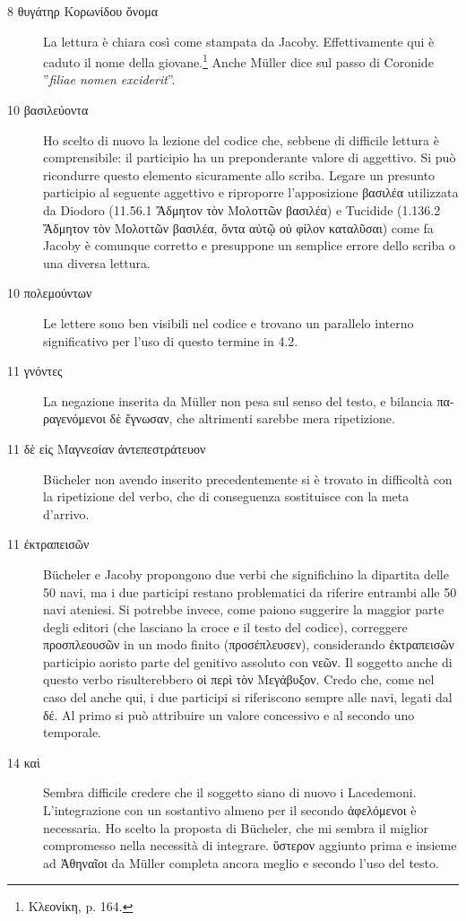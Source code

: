 \begin{description}
\item[8 \textgreek{θυγάτηρ Κορωνίδου ὄνομα}] La lettura è chiara così come stampata da Jacoby. Effettivamente qui è caduto il nome della giovane.\footnote{\textgreek{Κλεονίκη}, p. 164.} Anche Müller dice sul passo di Coronide ''\textit{filiae nomen exciderit}''.
\item[10 \textgreek{βασιλεύοντα}] Ho scelto di nuovo la lezione del codice che, sebbene di difficile lettura è comprensibile: il participio ha un preponderante valore di aggettivo. Si può ricondurre questo elemento sicuramente allo scriba. Legare un presunto participio al seguente aggettivo e riproporre l'apposizione \textgreek{βασιλέα} utilizzata da Diodoro (11.56.1 \textgreek{Ἄδμητον τὸν Μολοττῶν βασιλέα}) e Tucidide (1.136.2 \textgreek{Ἄδμητον τὸν Μολοττῶν βασιλέα, ὄντα αὐτῷ οὐ φίλον καταλῦσαι}) come fa Jacoby è comunque corretto e presuppone un semplice errore dello scriba o una diversa lettura.
\item[10 \textgreek{πολεμούντων}] Le lettere sono ben visibili nel codice e trovano un parallelo interno significativo per l'uso di questo termine in 4.2.
\item[11 \textgreek{ γνόντες}] La negazione inserita da Müller non pesa sul senso del testo, e bilancia \textgreek{παραγενόμενοι δὲ ἔγνωσαν}, che altrimenti sarebbe mera ripetizione.
\item[11 \textgreek{δὲ εἰς Μαγνεσίαν ἀντεπεστράτευον}] Bücheler non avendo inserito \textgreek{} precedentemente si è trovato in difficoltà con la ripetizione del verbo, che di conseguenza sostituisce con la meta d'arrivo.
\item[11 \textgreek{ἐκτραπεισῶν}]  Bücheler e Jacoby propongono due verbi che significhino la dipartita delle 50 navi, ma i due participi restano problematici da riferire entrambi alle 50 navi ateniesi. Si potrebbe invece, come paiono suggerire la maggior parte degli editori (che lasciano la croce e il testo del codice), correggere \textgreek{προσπλεουσῶν} in un modo finito (\textgreek{προσέπλευσεν}), considerando \textgreek{ἐκτραπεισῶν} participio aoristo parte del genitivo assoluto con \textgreek{νεῶν}. Il soggetto anche di questo verbo risulterebbero \textgreek{οἱ περὶ  τὸν Μεγάβυξον}. Credo che, come nel caso del \textgreek{} anche qui, i due participi si riferiscono sempre alle navi, legati dal \textgreek{δέ}. Al primo si può attribuire un valore concessivo e al secondo uno temporale.
\item[14 \textgreek{καὶ }] Sembra difficile credere che il soggetto siano di nuovo i Lacedemoni. L'integrazione con un sostantivo almeno per il secondo \textgreek{ἀφελόμενοι} è necessaria. Ho scelto la proposta di Bücheler, che mi sembra il miglior compromesso nella necessità di integrare. \textgreek{ὕστερον} aggiunto prima e insieme ad  \textgreek{Ἀθηναῖοι} da Müller completa ancora meglio e secondo l'uso del testo.

\end{description}
